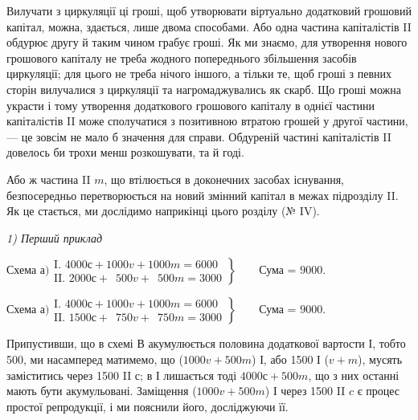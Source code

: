 Вилучати з циркуляції ці гроші, щоб утворювати віртуально додатковий
грошовий капітал, можна, здається, лише двома способами. Або
одна частина капіталістів II обдурює другу й таким чином грабує гроші.
Як ми знаємо, для утворення нового грошового капіталу не треба жодного
попереднього збільшення засобів циркуляції; для цього не треба
нічого іншого, а тільки те, щоб гроші з певних сторін вилучалися з
циркуляції та нагромаджувались як скарб. Що гроші можна украсти і
тому утворення додаткового грошового капіталу в однієї частини капіталістів
II може сполучатися з позитивною втратою грошей у другої частини,
— це зовсім не мало б значення для справи. Обдуреній частині
капіталістів II довелось би трохи менш розкошувати, та й годі.

Або ж частина II $m$, що втілюється в доконечних засобах існування,
безпосередньо перетворюється на новий змінний капітал в межах підрозділу
II. Як це стається, ми дослідимо наприкінці цього розділу
(№ IV).

\emph{1) Перший приклад}

\begin{center}

$
 \text{Схема а)} \left.\begin{aligned}
        \text{I. }4000 с + 1000 v + 1000 m = 6000\\
        \text{II. }2000 с + \phantom{0}500 v + \phantom{0}500 m = 3000
       \end{aligned}
 \right\}
   \qquad \text{Сума = 9000.}

$
\end{center}

\begin{center}

$
 \text{Схема а)} \left.\begin{aligned}
        \text{I. }4000 с + 1000 v + 1000 m = 6000\\
        \text{II. }1500 с + \phantom{0}750 v + \phantom{0}750 m = 3000
       \end{aligned}
 \right\}
  \qquad \text{Сума = 9000.}
$
\end{center}

Припустивши, що в схемі В акумулюється половина додаткової вартости
І, тобто 500, ми насамперед матимемо, що ($1000 v + 500 m$) І,
або 1500 І ($v + m$), мусять заміститись через 1500 II $с$; в І лишається
тоді $4000 с + 500 m$, що з них останні мають бути акумульовані.
Заміщення ($1000 v + 500 m$) І через 1500 II $c$ є процес простої репродукції,
і ми пояснили його, досліджуючи її.


